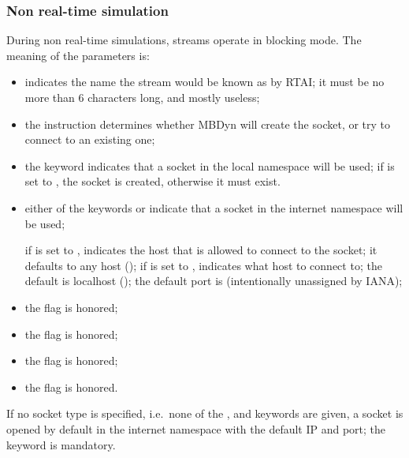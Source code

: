 


\subsubsection{Non real-time simulation}
During non real-time simulations, streams operate in blocking mode.
The meaning of the parameters is:
\begin{itemize}
\item {} indicates the name the stream would be known as
by RTAI; it must be no more than 6 characters long, and mostly useless;

\item the instruction  determines whether MBDyn will create
the socket, or try to connect to an existing one;

\item the keyword  indicates that a socket 
in the local namespace will be used; if  is set to ,
the socket is created, otherwise it must exist.

\item either of the keywords  or  indicate that a socket
in the internet namespace will be used;

if  is set to ,  indicates 
the host that is allowed to connect to the socket; it defaults 
to any host (); if  is set to ,
 indicates what host to connect to; the default 
is localhost (); the default port is 
(intentionally unassigned by IANA);

\item the flag  is honored;

\item the flag  is honored;

\item the flag  is honored;

\item the flag  is honored.
\end{itemize}
If no socket type is specified, i.e.\ none of the ,  
and  keywords are given, a socket is opened by default 
in the internet namespace with the default IP and port; the 
keyword is mandatory.



